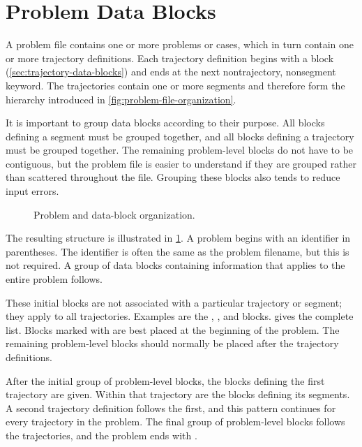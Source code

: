 \section{Problem Data Blocks}\label{sec:problem-data-blocks}

A problem file contains one or more problems or cases, which in turn contain one or
more trajectory definitions. Each trajectory definition begins with a
 block (\cref{sec:trajectory-data-blocks}) and ends at
the next nontrajectory, nonsegment keyword. The trajectories contain one or more
segments and therefore form the hierarchy introduced in
\cref{fig:problem-file-organization}.

It is important to group data blocks according to their purpose. All blocks defining
a segment must be grouped together, and all blocks defining a trajectory must be
grouped together. The remaining problem-level blocks do not have to be contiguous,
but the problem file is easier to understand if they are grouped rather than scattered
throughout the file. Grouping these blocks also tends to reduce input errors.

\begin{figure}[htbp]
  \centering
  
  \caption{Problem and data-block organization.}
  \label{fig:problem-data-block-organization}
\end{figure}

The resulting structure is illustrated in
\cref{fig:problem-data-block-organization}. A problem begins with an identifier in
parentheses. The identifier is often the same as the problem filename, but this is not
required. A group of data blocks containing information that applies to the entire
problem follows.

These initial blocks are not associated with a particular trajectory or segment; they
apply to all trajectories. Examples are the ,
, and  blocks.
 gives the complete list. Blocks marked with
\limitedstate{} are best placed at the beginning of the problem. The remaining
problem-level blocks should normally be placed after the trajectory definitions.

After the initial group of problem-level blocks, the blocks defining the first
trajectory are given. Within that trajectory are the blocks defining its segments. A
second trajectory definition follows the first, and this pattern continues for every
trajectory in the problem. The final group of problem-level blocks follows the
trajectories, and the problem ends with .

